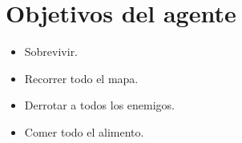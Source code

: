 \section{Objetivos del agente}

\begin{itemize}
\item Sobrevivir.
\item Recorrer todo el mapa.
\item Derrotar a todos los enemigos.
\item Comer todo el alimento.
\end{itemize}

